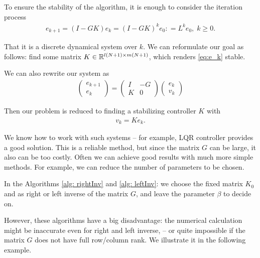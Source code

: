 To ensure the stability of the algorithm, it is enough to consider the iteration process 
\begin{align}
\label{eq:e_k}
e_{k+1} = (I - G K) e_k = (I - G K)^k e_0  : =  L^k e_{0}, \; k \geq 0.
\end{align}

That it is a discrete dynamical system over $k$. We can reformulate our goal as follows: find some matrix $K \in {\mathbb{R}}^{l(N+1) \times m (N+1)}$, which renders \eqref{eq:e_k} stable. %

We can also rewrite our system as
\begin{align}
\label{eq:ILC:e_kPlant}
\begin{pmatrix}
e_{k+1} \\ e_k
\end{pmatrix} = 
\left(
\begin{array}{c|c}
I & -G \\\hline K & 0
\end{array}\right) \begin{pmatrix}
e_k \\ v_k 
\end{pmatrix}
\end{align}

Then our problem is reduced to finding a stabilizing controller $K$  with 
\begin{align}
v_k = K e_k.
\end{align} 

We know how to work with such systems -- for example, LQR controller provides a good solution. This is a reliable method, but since the matrix $G$ can be large, it also can be too costly. Often we can achieve good results with much more simple methods. For example, we can reduce the number of parameters to be chosen. 

In the Algorithms \ref{alg: rightInv} and \ref{alg: leftInv}: we choose the fixed matrix $K_0$ and as right or left inverse of the matrix $G$, and leave the parameter $\beta$ to decide on. 

However, these algorithms have a big disadvantage: the numerical calculation might be inaccurate even for right and left inverse, -- or quite impossible if the matrix $G$ does not have full row/column rank. We illustrate it in the following example. 


